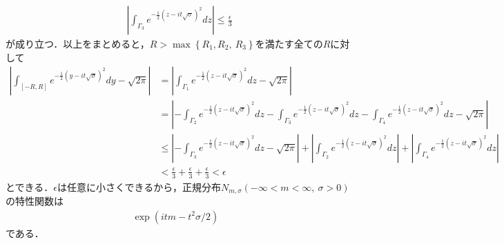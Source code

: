 \documentclass[a4j,papersize,disablejfam,slide,14pt]{jsarticle}
\def\max#1#2{\operatorname{max} \left\{ #1,\ #2 \right\}} %
\def\exp#1{e^{#1}} %
\begin{document}
    \begin{align}
    	\left| \int_{\Gamma_3} \exp{-\frac{1}{2} (z - it\sqrt{\sigma})^2} dz \right| \leq \frac{\epsilon}{3}
    \end{align}
    が成り立つ．以上をまとめると，$R > \max{R_1,R_2}{R_3}$を満たす全ての$R$に対して
    \begin{align}
    	\left| \int_{[-R,R]} \exp{-\frac{1}{2} (y - it\sqrt{\sigma})^2} dy - \sqrt{2\pi} \right| 
        &= \left| \int_{\Gamma_1} \exp{-\frac{1}{2} (z - it\sqrt{\sigma})^2} dz - \sqrt{2\pi} \right| \\
        &= \left| -\int_{\Gamma_2} \exp{-\frac{1}{2} (z - it\sqrt{\sigma})^2} dz 
        		-\int_{\Gamma_3} \exp{-\frac{1}{2} (z - it\sqrt{\sigma})^2} dz 
                -\int_{\Gamma_4} \exp{-\frac{1}{2} (z - it\sqrt{\sigma})^2} dz - \sqrt{2\pi} \right| \\
    	&\leq \left| -\int_{\Gamma_3} \exp{-\frac{1}{2} (z - it\sqrt{\sigma})^2} dz - \sqrt{2\pi} \right|
        	+ \left| \int_{\Gamma_2} \exp{-\frac{1}{2} (z - it\sqrt{\sigma})^2} dz \right|
            + \left| \int_{\Gamma_4} \exp{-\frac{1}{2} (z - it\sqrt{\sigma})^2} dz \right| \\
        &< \frac{\epsilon}{3} + \frac{\epsilon}{3} + \frac{\epsilon}{3} < \epsilon
    \end{align}
    とできる．$\epsilon$は任意に小さくできるから，正規分布$N_{m,\sigma} (-\infty < m < \infty,\ \sigma > 0)$の特性関数は
    \begin{align}
    	\operatorname{exp}(itm-t^2\sigma/2) & \label{eq:characteristic_function_norm}
    \end{align}
    である．
\end{document}
